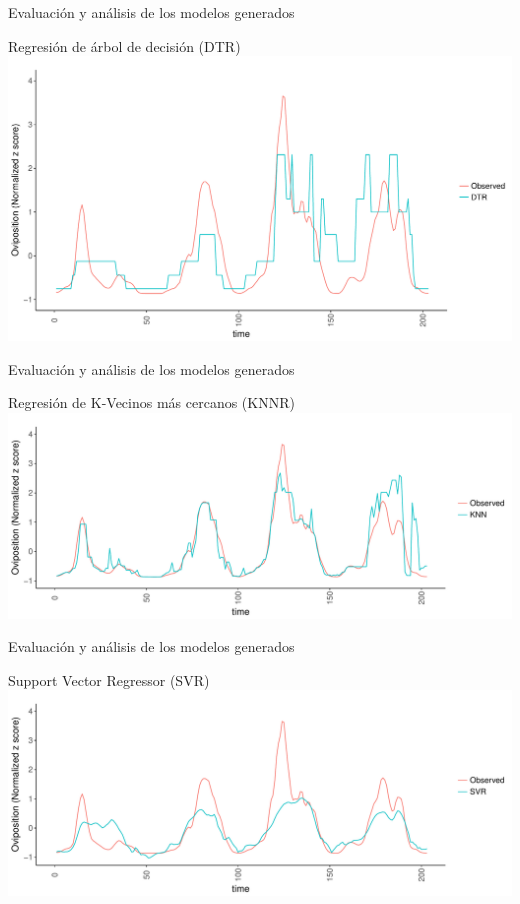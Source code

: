 \documentclass[10pt]{beamer}
\begin{document}
\begin{frame}{Evaluación y análisis de los modelos generados}
  \begin{center}
    Regresión de árbol de decisión (DTR)
    \includegraphics[width=1\textwidth]{dtr}
  \end{center}
\end{frame}


\begin{frame}{Evaluación y análisis de los modelos generados}
  \begin{center}
    Regresión de K-Vecinos más cercanos (KNNR)
    \includegraphics[width=1\textwidth]{knn}
  \end{center}
\end{frame}


\begin{frame}{Evaluación y análisis de los modelos generados}
  \begin{center}
    Support Vector Regressor (SVR)
    \includegraphics[width=1\textwidth]{svr}
  \end{center}
\end{frame}
\end{document}

